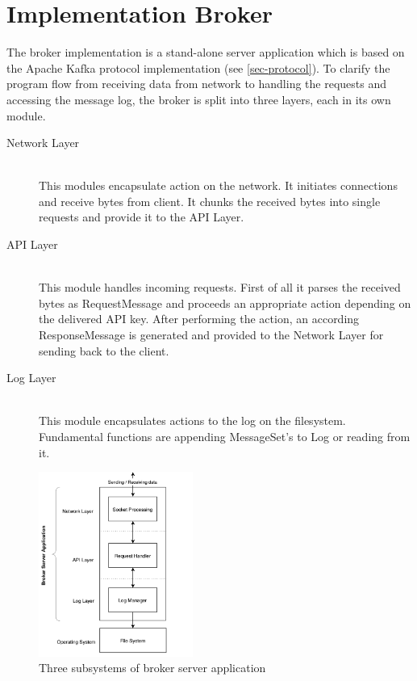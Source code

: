 \chapter{Implementation Broker}
\label{chap:broker}
The broker implementation is a stand-alone server application which is based on the
Apache Kafka protocol implementation (see \ref{sec-protocol}). To clarify the
program flow from receiving data from network to handling the requests and
accessing the message log, the broker is split into three
layers, each in its own module. 

\begin{description}
    \item [Network Layer] \hfill \\
        This modules encapsulate action on the network. It initiates
        connections and receive bytes from client. It chunks the received bytes
        into single requests and provide it to the API Layer. 
    \item [API Layer] \hfill \\
        This module handles incoming requests. First of all it parses the
        received bytes as RequestMessage and proceeds an appropriate action
        depending on the delivered API key. After performing the action, an
        according ResponseMessage is generated and provided to the Network Layer
        for sending back to the client. 
    \item [Log Layer] \hfill \\
        This module encapsulates actions to the log on the filesystem.
        Fundamental functions are appending MessageSet's to Log or reading from
        it. 
\end{description}

\begin{figure}[H]
    \centering
    \includegraphics[width=0.45\textwidth]{images/impl-brok-layers.png}
    \caption{Three subsystems of broker server application}
    \label{fig:impl-brok-layers}
\end{figure}

